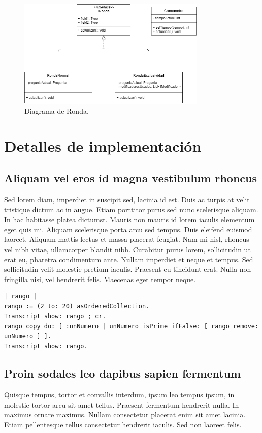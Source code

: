 \documentclass[titlepage,a4paper]{article}
\begin{document}
\begin{figure}[H]
    \centering
    \includegraphics[width=0.8\textwidth]{diagramaRonda.png}
    \caption{\label{fig:class04}Diagrama de Ronda.}
\end{figure}


\section{Detalles de implementación}\label{sec:implementacion}

\subsection{Aliquam vel eros id magna vestibulum rhoncus}
Sed lorem diam, imperdiet in suscipit sed, lacinia id est. Duis ac turpis at velit tristique dictum ac in augue. Etiam porttitor purus sed nunc scelerisque aliquam. In hac habitasse platea dictumst. Mauris non mauris id lorem iaculis elementum eget quis mi. Aliquam scelerisque porta arcu sed tempus. Duis eleifend euismod laoreet. Aliquam mattis lectus et massa placerat feugiat. Nam mi nisl, rhoncus vel nibh vitae, ullamcorper blandit nibh. Curabitur purus lorem, sollicitudin ut erat eu, pharetra condimentum ante. Nullam imperdiet et neque et tempus. Sed sollicitudin velit molestie pretium iaculis. Praesent eu tincidunt erat. Nulla non fringilla nisi, vel hendrerit felis. Maecenas eget tempor neque.

\begin{verbatim}
| rango |
rango := (2 to: 20) asOrderedCollection.
Transcript show: rango ; cr.
rango copy do: [ :unNumero | unNumero isPrime ifFalse: [ rango remove: unNumero ] ].
Transcript show: rango.
\end{verbatim}

\subsection{Proin sodales leo dapibus sapien fermentum}
Quisque tempus, tortor et convallis interdum, ipsum leo tempus ipsum, in molestie tortor arcu sit amet tellus. Praesent fermentum hendrerit nulla. In maximus ornare maximus. Nullam consectetur placerat enim sit amet lacinia. Etiam pellentesque tellus consectetur hendrerit iaculis. Sed non laoreet felis.
\end{document}
